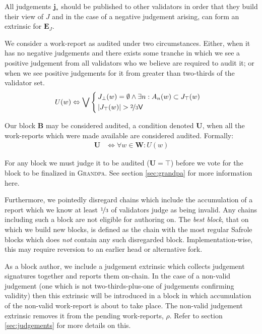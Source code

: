 All judgements $\mathbf{j}_*$ should be published to other validators in order that they build their view of $J$ and in the case of a negative judgement arising, can form an extrinsic for $\mathbf{E}_J$.

We consider a work-report as audited under two circumstances. Either, when it has no negative judgements and there exists some tranche in which we see a positive judgement from all validators who we believe are required to audit it; or when we see positive judgements for it from greater than two-thirds of the validator set.
\begin{align}
  U(w) &\Leftrightarrow \bigvee\,\left\{\,\begin{aligned}
      &J_\bot(w) = \emptyset \wedge \exists n : A_n(w) \subset J_\top(w) \\
      &|J_\top(w)| > \nicefrac{2}{3}\mathsf{V}
  \end{aligned}\right.
\end{align}

Our block $\mathbf{B}$ may be considered audited, a condition denoted $\mathbf{U}$, when all the work-reports which were made available are considered audited. Formally:
\begin{align}
  \mathbf{U} &\Leftrightarrow \forall w \in \mathbf{W} : U(w)
\end{align}

For any block we must judge it to be audited (\ie $\mathbf{U} = \top$) before we vote for the block to be finalized in \textsc{Grandpa}. See section \ref{sec:grandpa} for more information here.

Furthermore, we pointedly disregard chains which include the accumulation of a report which we know at least $\nicefrac{1}{3}$ of validators judge as being invalid. Any chains including such a block are not eligible for authoring on. The \emph{best block}, \ie that on which we build new blocks, is defined as the chain with the most regular Safrole blocks which does \emph{not} contain any such disregarded block. Implementation-wise, this may require reversion to an earlier head or alternative fork.

As a block author, we include a judgement extrinsic which collects judgement signatures together and reports them on-chain. In the case of a non-valid judgement (\ie one which is not two-thirds-plus-one of judgements confirming validity) then this extrinsic will be introduced in a block in which accumulation of the non-valid work-report is about to take place. The non-valid judgement extrinsic removes it from the pending work-reports, $\rho$. Refer to section \ref{sec:judgements} for more details on this.

